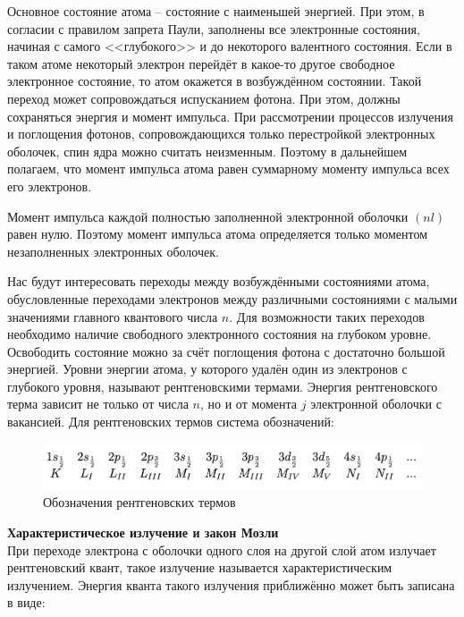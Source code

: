 \documentclass[a4paper, 12pt]{article}%
\begin{document}
		Основное состояние атома -- состояние с наименьшей энергией.  При этом,  в согласии с правилом запрета Паули,  заполнены все электронные состояния,  начиная с самого <<глубокого>> и до некоторого валентного состояния.  Если в таком атоме некоторый электрон перейдёт в какое-то другое свободное электронное состояние,  то атом окажется в возбуждённом состоянии.  Такой переход может сопровождаться испусканием фотона.  При этом,  должны сохраняться энергия и момент импульса.  При рассмотрении процессов излучения и поглощения фотонов, сопровождающихся только перестройкой электронных оболочек,  спин ядра можно считать неизменным.  Поэтому в дальнейшем полагаем, что момент импульса атома равен суммарному моменту импульса всех его электронов.
   
		Момент импульса каждой полностью заполненной электронной оболочки $(nl)$ равен нулю.  Поэтому момент импульса атома определяется только моментом незаполненных электронных оболочек. 
								
		Нас будут интересовать переходы между возбуждёнными состояниями атома,  обусловленные переходами электронов между различными состояниями с малыми значениями главного квантового числа $n$.  Для возможности таких переходов необходимо наличие свободного электронного состояния на глубоком уровне.  Освободить состояние можно за счёт поглощения фотона с достаточно большой энергией. Уровни энергии атома,  у которого удалён один из электронов с глубокого уровня,  называют рентгеновскими термами.  Энергия рентгеновского терма зависит не только от числа $n$,  но и от момента $j$ электронной оболочки с вакансией.  Для рентгеновских термов система обозначений: 
				
		\begin{figure}[h!]
			\centering
			\includegraphics[scale=0.5]{Рентгеновские_термы.png}
			\caption{Обозначения рентгеновских термов}
		\end{figure}
				
		\textbf{	Характеристическое излучение и закон Мозли}\\

		При переходе электрона с оболочки одного слоя на другой слой атом излучает рентгеновский квант,  такое излучение называется характеристическим излучением.  Энергия кванта такого излучения приближённо может быть записана в виде:
			
\end{document}
